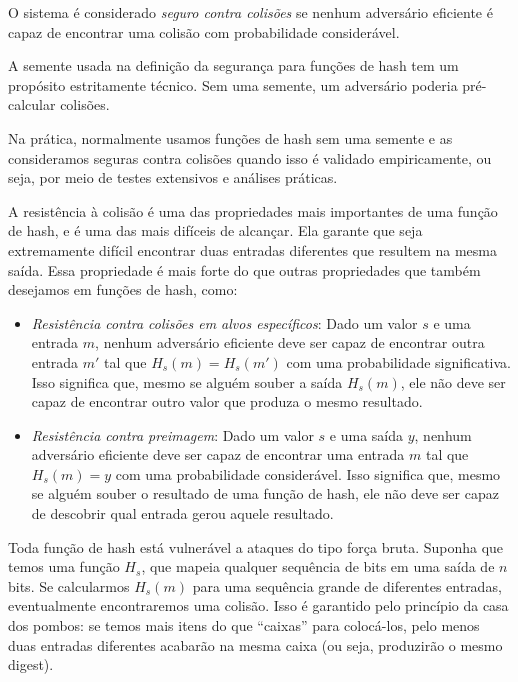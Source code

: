 O sistema é considerado {\em seguro contra colisões} se nenhum adversário eficiente é capaz de encontrar uma colisão com probabilidade considerável.

\begin{center}
\end{center}


A semente usada na definição da segurança para funções de hash tem um propósito estritamente técnico.
Sem uma semente, um adversário poderia pré-calcular colisões.

Na prática, normalmente usamos funções de hash sem uma semente e as consideramos seguras contra colisões quando isso é validado empiricamente, ou seja, por meio de testes extensivos e análises práticas.

A resistência à colisão é uma das propriedades mais importantes de uma função de hash, e é uma das mais difíceis de alcançar.
Ela garante que seja extremamente difícil encontrar duas entradas diferentes que resultem na mesma saída.
Essa propriedade é mais forte do que outras propriedades que também desejamos em funções de hash, como:
\begin{itemize}
\item[] {\em Resistência contra colisões em alvos específicos}:
  Dado um valor $s$ e uma entrada $m$, nenhum adversário eficiente deve ser capaz de encontrar outra entrada $m'$  tal que $H_s(m) = H_s(m')$ com uma probabilidade significativa.
  Isso significa que, mesmo se alguém souber a saída $H_s(m)$, ele não deve ser capaz de encontrar outro valor que produza o mesmo resultado.
\item[] {\em Resistência contra preimagem}:
  Dado um valor $s$ e uma saída $y$, nenhum adversário eficiente deve ser capaz de encontrar uma entrada $m$ tal que $H_s(m)=y$ com uma probabilidade considerável.
  Isso significa que, mesmo se alguém souber o resultado de uma função de hash, ele não deve ser capaz de descobrir qual entrada gerou aquele resultado.
\end{itemize}


Toda função de hash está vulnerável a ataques do tipo força bruta. Suponha que temos uma função $H_s$, que mapeia qualquer sequência de bits em uma saída de $n$ bits.
Se calcularmos $H_s(m)$ para uma sequência grande de diferentes entradas, eventualmente encontraremos uma colisão.
Isso é garantido pelo princípio da casa dos pombos:
se temos mais itens do que ``caixas'' para colocá-los, pelo menos duas entradas diferentes acabarão na mesma caixa (ou seja, produzirão o mesmo digest).


